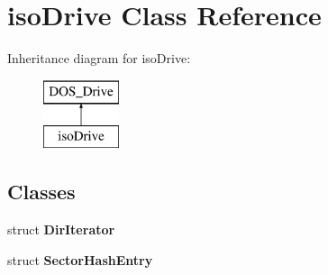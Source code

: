 \hypertarget{classisoDrive}{\section{iso\-Drive Class Reference}
\label{classisoDrive}
}
Inheritance diagram for iso\-Drive\-:\begin{figure}[H]
\begin{center}
\leavevmode
\includegraphics[height=2.000000cm]{classisoDrive}
\end{center}
\end{figure}
\subsection*{Classes}
\begin{DoxyCompactItemize}
\item 
struct {\bfseries Dir\-Iterator}
\item 
struct {\bfseries Sector\-Hash\-Entry}
\end{DoxyCompactItemize}
